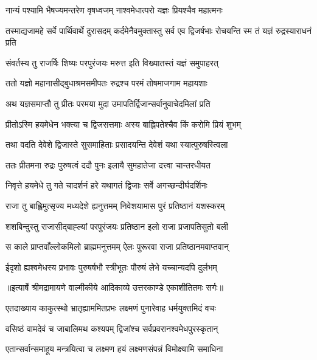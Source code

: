 \twolineshloka
{नान्यं पश्यामि भैषज्यमन्तरेण वृषध्वजम्}
{नाश्वमेधात्परो यज्ञः प्रियश्चैव महात्मनः} %

\threelineshloka
{तस्माद्यजामहे सर्वे पार्थिवार्थे दुरासदम्}
{कर्दमेनैवमुक्तास्तु सर्व एव द्विजर्षभाः}
{रोचयन्ति स्म तं यज्ञं रुद्रस्याराधनं प्रति} %

\twolineshloka
{संवर्तस्य तु राजर्षिः शिष्यः परपुरंजयः}
{मरुत्त इति विख्यातस्तं यज्ञं समुपाहरत्} %

\twolineshloka
{ततो यज्ञो महानासीद्बुधाश्रमसमीपतः}
{रुद्रश्च परमं तोषमाजगाम महायशाः} %

\twolineshloka
{अथ यज्ञसमाप्तौ तु प्रीतः परमया मुदा}
{उमापतिर्द्विजान्सर्वानुवाचेदमिलां प्रति} %

\twolineshloka
{प्रीतोऽस्मि हयमेधेन भक्त्या च द्विजसत्तमाः}
{अस्य बाह्लिपतेश्चैव किं करोमि प्रियं शुभम्} %

\twolineshloka
{तथा वदति देवेशे द्विजास्ते सुसमाहिताः}
{प्रसादयन्ति देवेशं यथा स्यात्पुरुषस्त्विला} %

\twolineshloka
{ततः प्रीतमना रुद्रः पुरुषत्वं ददौ पुनः}
{इलायै सुमहातेजा दत्त्वा चान्तरधीयत} %

\twolineshloka
{निवृत्ते हयमेधे तु गते चादर्शनं हरे}
{यथागतं द्विजाः सर्वे अगच्छन्दीर्घदर्शिनः} %

\twolineshloka
{राजा तु बाह्लिमुत्सृज्य मध्यदेशे ह्यनुत्तमम्}
{निवेशयामास पुरं प्रतिष्ठानं यशस्करम्} %

\twolineshloka
{शशबिन्दुस्तु राजासीद्बाह्ल्यां परपुरंजयः}
{प्रतिष्ठान इलो राजा प्रजापतिसुतो बली} %

\twolineshloka
{स काले प्राप्तवाँल्लोकमिलो ब्राह्ममनुत्तमम्}
{ऐलः पुरूरवा राजा प्रतिष्ठानमवाप्तवान्} %

\twolineshloka
{ईदृशो ह्यश्वमेधस्य प्रभावः पुरुषर्षभौ}
{स्त्रीभूतः पौरुषं लेभे यच्चान्यदपि दुर्लभम्} %


{॥इत्यार्षे श्रीमद्रामायणे वाल्मीकीये आदिकाव्ये उत्तरकाण्डे एकाशीतितमः सर्गः॥}


\twolineshloka
{एतदाख्याय काकुत्स्थो भ्रातृह्याममितप्रभः}
{लक्ष्मणं पुनारेवाह धर्मयुक्तमिदं वचः} %

\twolineshloka
{वसिष्ठं वामदेवं च जाबालिमथ कश्यपम्}
{द्विजांश्च सर्वप्रवरानश्वमेधपुरस्कृतान्} %

\twolineshloka
{एतान्सर्वान्समाहूय मन्त्रयित्वा च लक्ष्मण}
{हयं लक्ष्मणसंपन्नं विमोक्ष्यामि समाधिना} %

